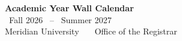 \documentclass[10pt]{article}
\begin{document}
\begin{center}
\end{center}

\vspace{4mm}
\begin{center}
{\fontsize{34}{40}\selectfont\bfseries\textcolor{inknavy}{Academic Year Wall Calendar}}\\[3mm]
{\Large\textcolor{catrose}{\faCalendar} \ \textcolor{inknavy!85}{Fall 2026 \ -- \ Summer 2027}}\\[2mm]
{\large\textcolor{inknavy!70}{Meridian University \ \textbullet\ \ Office of the Registrar}}
\end{center}

\vspace{9mm}
\end{document}
